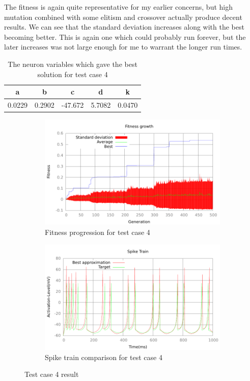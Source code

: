 The fitness is again quite representative for my earlier concerns, but high
mutation combined with some elitism and crossover actually produce decent
results. We can see that the standard deviation increases along with the best
becoming better. This is again one which could probably run forever, but the
later increases was not large enough for me to warrant the longer run times.
\begin{table}
	\begin{tabular}{c c c c c}
		a & b & c & d & k \\
		\hline
		0.0229 & 0.2902 & -47.672 & 5.7082 & 0.0470
	\end{tabular}
	\caption{The neuron variables which gave the best solution for test case
	4}
\end{table}
\begin{figure}[h]
	\centering
	\begin{subfigure}[b]{0.5\textwidth}
		\includegraphics[width=\textwidth]{../output/stdm_izzy_2_fitness.pdf}
		\caption{Fitness progression for test case 4}
		\label{fig:fitness-test-case-4}
	\end{subfigure}%
	\begin{subfigure}[b]{0.5\textwidth}
		\includegraphics[width=\textwidth]{../output/stdm_izzy_2_spike.pdf}
		\caption{Spike train comparison for test case 4}
		\label{fig:spike-test-case-4}
	\end{subfigure}
	\caption{Test case 4 result}
\end{figure}

